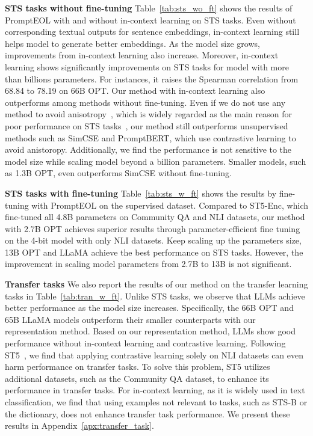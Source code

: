 \documentclass{article}
\begin{document}
\textbf{STS tasks without fine-tuning}
Table~\ref{tab:sts_wo_ft} shows the results of PromptEOL with and without in-context learning on STS tasks.
Even without corresponding textual outputs for sentence embeddings, in-context learning still helps model to generate better embeddings.
As the model size grows, improvements from in-context learning also increase.
Moreover, in-context learning shows significantly improvements on STS tasks for model with more than billions parameters.
For instances, it raises the Spearman correlation from 68.84 to 78.19 on 66B OPT.
Our method with in-context learning also outperforms among methods without fine-tuning.
Even if we do not use any method to avoid anisotropy~\cite{ethayarajh2019contextual}, which is widely regarded as the main reason for poor performance on STS tasks~\cite{gao2021simcse, sentencet5}, our method still outperforms unsupervised methods such as SimCSE and PromptBERT, which use contrastive learning to avoid anistoropy.
Additionally, we find the performance is not sensitive to the model size while scaling model beyond a billion parameters.
Smaller models, such as 1.3B OPT, even outperforms SimCSE without fine-tuning.

\textbf{STS tasks with fine-tuning}
Table~\ref{tab:sts_w_ft} shows the results by fine-tuning with PromptEOL on the supervised dataset.
Compared to ST5-Enc, which fine-tuned all 4.8B parameters on Community QA and NLI datasets,
our method with 2.7B OPT achieves superior results through parameter-efficient fine tuning on the 4-bit model with only NLI datasets.
Keep scaling up the parameters size, 13B OPT and LLaMA achieve the best performance on STS tasks.
However, the improvement in scaling model parameters from 2.7B to 13B is not significant.


\textbf{Transfer tasks}
We also report the results of our method on the transfer learning tasks in Table~\ref{tab:tran_w_ft}.
Unlike STS tasks, we observe that LLMs achieve better performance as the model size increases.
Specifically, the 66B OPT and 65B LLaMA models outperform their smaller counterparts with our representation method.
Based on our representation method, LLMs show good performance without in-context learning and contrastive learning.
Following ST5~\cite{sentencet5}, we find that applying contrastive learning solely on NLI datasets can even harm performance on transfer tasks.
To solve this problem, ST5 utilizes additional datasets, such as the Community QA dataset, to enhance its performance in transfer tasks.
For in-context learning, as it is widely used in text classification,
we find that using examples not relevant to tasks, such as STS-B or the dictionary, does not enhance transfer task performance.
We present these results in Appendix~\ref{apx:transfer_task}.
\end{document}
